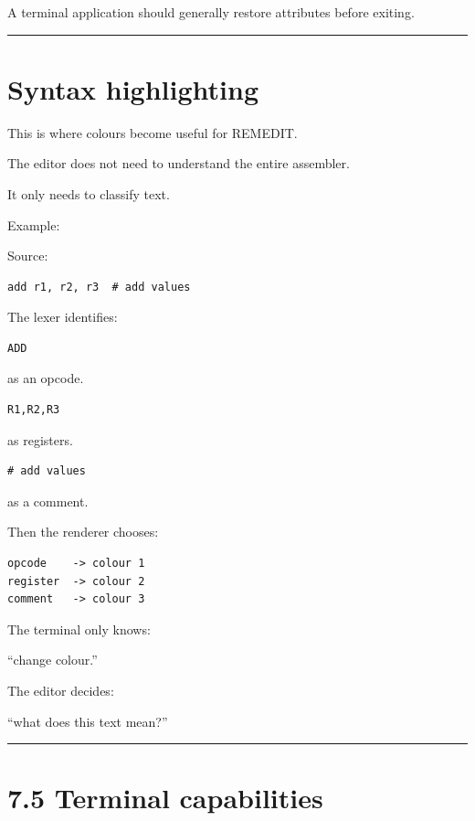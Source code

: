 \documentclass[
  oneside,
  openany]{book}
\begin{document}
A terminal application should generally restore attributes before
exiting.

\begin{center}\rule{0.5\linewidth}{0.5pt}\end{center}

\hypertarget{syntax-highlighting}{%
\section{Syntax highlighting}\label{syntax-highlighting}}

This is where colours become useful for REMEDIT.

The editor does not need to understand the entire assembler.

It only needs to classify text.

Example:

Source:

\begin{verbatim}
add r1, r2, r3  # add values
\end{verbatim}

The lexer identifies:

\begin{verbatim}
ADD
\end{verbatim}

as an opcode.

\begin{verbatim}
R1,R2,R3
\end{verbatim}

as registers.

\begin{verbatim}
# add values
\end{verbatim}

as a comment.

Then the renderer chooses:

\begin{verbatim}
opcode    -> colour 1
register  -> colour 2
comment   -> colour 3
\end{verbatim}

The terminal only knows:

``change colour.''

The editor decides:

``what does this text mean?''

\begin{center}\rule{0.5\linewidth}{0.5pt}\end{center}

\hypertarget{terminal-capabilities}{%
\section{7.5 Terminal capabilities}\label{terminal-capabilities}}
\end{document}
